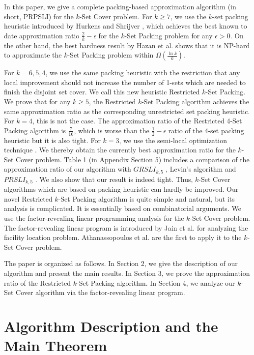 \documentclass[runningheads,a4paper]{llncs}
\numberwithin{equation}{section}
\begin{document}
In this paper, we give a complete packing-based approximation algorithm (in short, PRPSLI) for the $k$-Set Cover problem. For $k\geq 7$, we use the $k$-set packing heuristic introduced by Hurkens and Shrijver \cite{schrijver}, which achieves the best known to date approximation ratio $\frac{2}{k}-\epsilon$ for the $k$-Set Packing problem for any $\epsilon>0$. On the other hand, the best hardness result by Hazan et al. \cite{hazan} shows that it is NP-hard to approximate the $k$-Set Packing problem within $\Omega(\frac{\ln k}{k})$.

For $k=6,5,4$, we use the same packing heuristic with the restriction that any local improvement should not increase the number of 1-sets which are needed to finish the disjoint set cover. We call this new heuristic Restricted $k$-Set Packing. We prove that for any $k\geq 5$, the Restricted $k$-Set Packing algorithm achieves the same approximation ratio as the corresponding unrestricted set packing heuristic. For $k=4$, this is not the case. The approximation ratio of the Restricted 4-Set Packing algorithm is $\frac{7}{16}$, which is worse than the $\frac{1}{2}-\epsilon$ ratio of the 4-set packing heuristic but it is also tight. For $k=3$, we use the semi-local optimization technique \cite{furer}. We thereby obtain the currently best approximation ratio for the $k$-Set Cover problem. Table 1 (in Appendix Section 5) includes a comparison of the approximation ratio of our algorithm with $GRSLI_{k,5}$ \cite{furer}, Levin's algorithm \cite{levin} and $PRSLI_{k,5}$ \cite{lp}. We also show that our result is indeed tight. Thus, $k$-Set Cover algorithms which are based on packing heuristic can hardly be improved. Our novel Restricted $k$-Set Packing algorithm is quite simple and natural, but its analysis is complicated. It
is essentially based on combinatorial arguments. We use the factor-revealing linear programming analysis for the $k$-Set Cover problem. The factor-revealing linear program is introduced by Jain et al. \cite{lp1} for analyzing the facility location problem. Athanassopoulos et al. \cite{lp} are the first to apply it to the $k$-Set Cover problem.

The paper is organized as follows. In Section 2, we give the description of our algorithm and present the main results. In Section 3, we prove the approximation ratio of the Restricted $k$-Set Packing algorithm. In Section 4, we analyze our $k$-Set Cover algorithm via the factor-revealing linear program.


\section{Algorithm Description and the Main Theorem}
\end{document}
